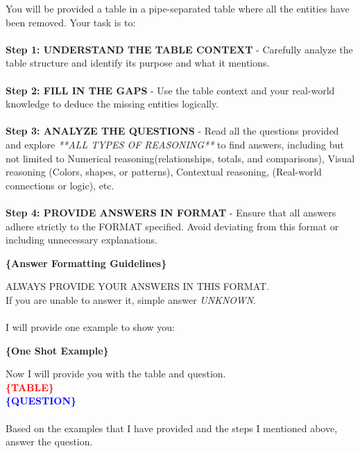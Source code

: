 \documentclass[11pt]{article}
\newcommand{\varred}[1]{\textcolor{red}{\textbf{#1}}}
\newcommand{\varblue}[1]{\textcolor{blue}{\textbf{#1}}}
\newcommand{\vargreen}[1]{\textcolor{olivegreen}{\textbf{#1}}}
\begin{document}
\begin{tcolorbox}[breakable,colback=lightestgray,colframe=black,title=\centering\textbf{Missing Image Baseline Prompt}]
You will be provided a table in a pipe-separated table where all the entities have been removed. Your task is to:\\\\

\textbf{Step 1: UNDERSTAND THE TABLE CONTEXT} -
Carefully analyze the table structure and identify its purpose and what it mentions.\\\\
\textbf{Step 2: FILL IN THE GAPS} -
Use the table context and your real-world knowledge to deduce the missing entities logically.\\\\
\textbf{Step 3: ANALYZE THE QUESTIONS} -
Read all the questions provided and explore \textit{**ALL TYPES OF REASONING**} to find answers, including but not limited to Numerical reasoning(relationships, totals, and comparisons), Visual reasoning (Colors, shapes, or patterns), Contextual reasoning, (Real-world connections or logic), etc.\\\\

\textbf{Step 4: PROVIDE ANSWERS IN FORMAT} -
Ensure that all answers adhere strictly to the FORMAT specified. Avoid deviating from this format or including unnecessary explanations.

\textbf{\vargreen{\{Answer Formatting Guidelines\}}}

ALWAYS PROVIDE YOUR ANSWERS IN THIS FORMAT.\\

If you are unable to answer it, simple answer \textit{UNKNOWN}.\\\\

I will provide one example to show you:

\textbf{\vargreen{\{One Shot Example\}}}



Now I will provide you with the table and question. 
\\
\textbf{\varred{\{TABLE\}}}
\\
\textbf{\varblue{\{QUESTION\}}}
\\\\
Based on the examples that I have provided and the steps I mentioned above, answer the question.
\end{tcolorbox}
\end{document}
